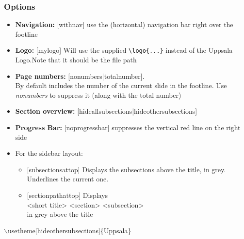 \documentclass{beamer}
\begin{document}
\begin{frame}
  \frametitle{Options}

  \begin{itemize}
    \item{\textbf{Navigation:} [withnav] use the (horizontal) navigation bar right over the footline}
    \item{\textbf{Logo:} [mylogo] Will use the supplied {\verb!\logo{...}!} instead of the Uppsala Logo.{\tiny{Note that it should be the file path}}}
    \item{\textbf{Page numbers:} [nonumbers|totalnumber]. \\By default
        includes the number of the current slide in the footline. Use
        \emph{nonumbers} to suppress it (along with the total number)}
    \item{\textbf{Section overview:} [hideallsubsections|hideothersubsections]}
      \pagebreak
    \item{\textbf{Progress Bar:} [noprogressbar] suppresses the vertical red line on the right side}
    \item{For the sidebar layout:
        \begin{itemize}
        \item{ [subsectionsattop] Displays the subsections above the title, in grey. Underlines the current one.}
        \item{ [sectionpathattop] Displays \\{<short title> \insertgotosymbol <section> \insertgotosymbol <subsection>}\\in grey above the title}
        \end{itemize}
      }
  \end{itemize}

    \begin{example}[My favorite]
      {\footnotesize{
	  $\backslash$usetheme[hideothersubsections]\{Uppsala\}
      }}
  \end{example}

\end{frame}
\end{document}
